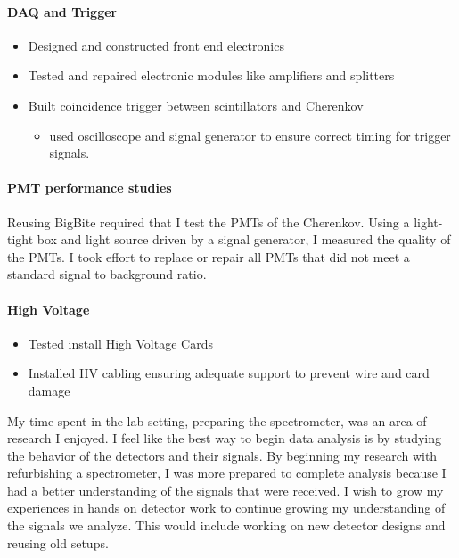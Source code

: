 \documentclass[12pt,letterpaper]{article}
\begin{document}
\paragraph{DAQ and Trigger}
\begin{itemize}
	 \setlength\itemsep{0.0025em}
	\item Designed and constructed front end electronics
	\item Tested and repaired electronic modules like amplifiers and splitters
	\item  Built coincidence trigger between scintillators and Cherenkov
	\vspace{-0.5em}
	\begin{itemize}
			 \setlength\itemsep{0.00025em}
		\item used oscilloscope and signal generator to ensure correct timing for trigger signals. 
	\end{itemize}
\end{itemize} 
\vspace{-1em}
\paragraph{ PMT performance studies}
 Reusing BigBite required that I test the PMTs of the Cherenkov. Using a light-tight box and light source driven by a signal generator, I measured the quality of the PMTs. I took effort to replace or repair all PMTs that did not meet a standard signal to background ratio. 
 \vspace{-1em}
 \paragraph{High Voltage}
 \begin{itemize}
    \setlength\itemsep{0.0025em}
 	\item Tested install High Voltage Cards
 	\item Installed HV cabling ensuring adequate support to prevent wire and card damage
 \end{itemize}

My time spent in the lab setting, preparing the spectrometer, was an area of research I enjoyed. I feel like the best way to begin data analysis is by studying the behavior of the detectors and their signals. By beginning my research with refurbishing a spectrometer, I was more prepared to complete analysis because I had a better understanding of the signals that were received. I wish to grow my experiences in hands on detector work to continue growing my understanding of the signals we analyze. This would include working on new detector designs and reusing old setups. 
\end{document}
